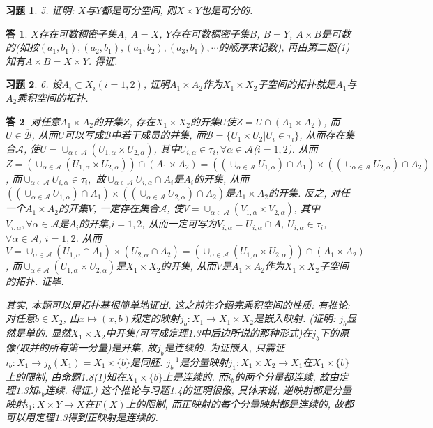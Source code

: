 \documentclass{ctexart}%
\newtheorem*{exercise}{习题}
\newtheorem*{solution}{答}
\theoremstyle{definition}
\theoremstyle{remark}
\begin{document}
\begin{exercise}5. 证明: $X$与$Y$都是可分空间, 则$X\times Y$也是可分的.
\end{exercise}
\begin{solution}
$X$存在可数稠密子集$A$, $\overline{A}=X$, $Y$存在可数稠密子集$B$, $\overline{B}=Y$, $A\times B$是可数的(如按$(a_1,b_1),(a_2,b_1),(a_1,b_2),(a_3,b_1),\cdots$的顺序来记数), 再由第二题(1)知有$\overline{A\times B}=X\times Y$. 得证.
\end{solution}

\begin{exercise}6. 设$A_i\subset X_i(i=1,2)$, 证明$A_1\times A_2$作为$X_1\times X_2$子空间的拓扑就是$A_1$与$A_2$乘积空间的拓扑.
\end{exercise}
\begin{solution}
对任意$A_1\times A_2$的开集$Z$, 存在$X_1\times X_2$的开集$U$使$Z=U\cap(A_1\times A_2)$, 而$U\in \overline{\mathscr{B}}$, 从而$U$可以写成$\mathscr{B}$中若干成员的并集, 而$\mathscr{B}=\{U_1\times U_2|U_i\in\tau_i\}$, 从而存在集合$\mathscr{A}$, 使$U=\cup_{\alpha\in \mathscr{A}}(U_{1,\alpha}\times U_{2,\alpha})$, 其中$U_{i,\alpha}\in \tau_i,\forall \alpha\in \mathscr{A}$($i=1,2$).  从而$Z=\left(\cup_{\alpha\in \mathscr{A}}(U_{1,\alpha}\times U_{2,\alpha})\right)\cap (A_1\times A_2)=
\left( (\cup_{\alpha\in \mathscr{A}} U_{1,\alpha})\cap A_1\right)\times 
\left( (\cup_{\alpha\in \mathscr{A}} U_{2,\alpha})\cap A_2\right)$, 而$\cup_{\alpha\in \mathscr{A}} U_{i,\alpha} \in \tau_i,$ 故$\cup_{\alpha\in \mathscr{A}} U_{i,\alpha} \cap A_i$是$A_i$的开集, 从而$\left( (\cup_{\alpha\in \mathscr{A}} U_{1,\alpha})\cap A_1\right)\times 
\left( (\cup_{\alpha\in \mathscr{A}} U_{2,\alpha})\cap A_2\right)$是$A_1\times A_2$的开集. 反之, 对任一个$A_1\times A_2$的开集$V$, 一定存在集合$\mathscr{A}$, 使$V=\cup_{\alpha\in \mathscr{A}}(V_{1,\alpha}\times V_{2,\alpha})$, 其中$V_{i,\alpha},\forall \alpha\in \mathscr{A}$是$A_i$的开集,$i=1,2$, 从而一定可写为$V_{i,\alpha}=U_{i,\alpha}\cap A$, $U_{i,\alpha}\in \tau
_i$, $\forall \alpha \in \mathscr{A}$, $i=1,2$. 从而$V= \cup_{\alpha\in\mathscr{A}}(U_{1,\alpha}\cap A_1)\times (U_{2,\alpha}\cap A_2)=\left(\cup_{\alpha\in \mathscr{A}} (U_{1,\alpha}\times U_{2,\alpha})\right)\cap(A_1\times A_2)$, 而$\cup_{\alpha\in \mathscr{A}} (U_{1,\alpha}\times U_{2,\alpha})$是$X_1\times X_2$的开集, 从而$V$是$A_1\times A_2$作为$X_1\times X_2$子空间的拓扑. 证毕.

其实, 本题可以用拓扑基很简单地证出. 这之前先介绍完乘积空间的性质: 有推论: 对任意$b\in X_2$, 由$x\mapsto (x,b)$规定的映射$j_b:X_1\rightarrow X_1\times X_2$是嵌入映射. (证明: $j_b$显然是单的. 显然$X_1\times X_2$中开集(可写成定理1.3中后边所说的那种形式)在$j_b$下的原像(取并的所有第一分量)是开集, 故$j_b$是连续的. 为证嵌入, 只需证$i_b: X_1\rightarrow j_b(X_1)=X_1\times \{b\}$是同胚. $j^{-1}_b$是分量映射$j_1: X_1\times X_2\rightarrow X_1$在$X_1\times \{b\}$上的限制, 由命题1.8(1)知在$X_1\times\{b\}$上是连续的. 而$i_b$的两个分量都连续, 故由定理1.3知$i_b$连续. 得证.) 这个推论与习题1.4的证明很像, 具体来说, 逆映射都是分量映射$i_1:X\times Y\rightarrow X$在$F(X)$上的限制, 而正映射的每个分量映射都是连续的, 故都可以用定理1.3得到正映射是连续的. 


\end{solution}
\end{document}
